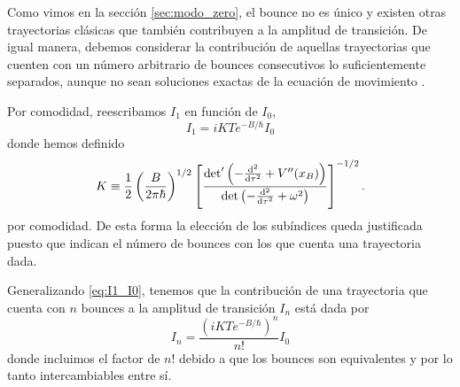 Como vimos en la sección \ref{sec:modo_zero}, el bounce no es único y existen otras trayectorias clásicas que también contribuyen a la amplitud de transición. De igual manera, debemos considerar la contribución de aquellas trayectorias que cuenten con un número arbitrario de bounces consecutivos lo suficientemente separados, aunque no sean soluciones exactas de la ecuación de movimiento \cite{weinberg2012classical}. 

Por comodidad, reescribamos $I_1$ 
en función de $I_0$, 
\begin{equation} \label{eq:I1_I0}
	I_1 = iKTe^{-B/\hbar}I_0
\end{equation}
donde hemos definido 
\begin{equation}
K \equiv \frac{1}{2} \left(\frac{B}{2\pi\hbar}\right)^{1/2} \left[ \frac{\textrm{det}' \left(-\dv[2]{}{\tau} + V''(x_B) \right)}{\det \left(-\dv[2]{}{\tau} + \omega^2 \right)}\right]^{-1/2}.
\end{equation}
por comodidad. De esta forma la elección  de los subíndices queda justificada puesto que indican el número de bounces con los que cuenta una trayectoria dada. 

Generalizando \eqref{eq:I1_I0}, tenemos que la contribución de una trayectoria que cuenta con $n$ bounces a la amplitud de transición $I_n$ está dada por
\begin{equation} \label{eq:I_n}
I_n = \frac{\left(iKTe^{-B/\hbar}\right)^n}{n!} I_0
\end{equation}
donde incluimos el factor de $n!$ debido a que los bounces son equivalentes y por lo tanto intercambiables entre sí. 

